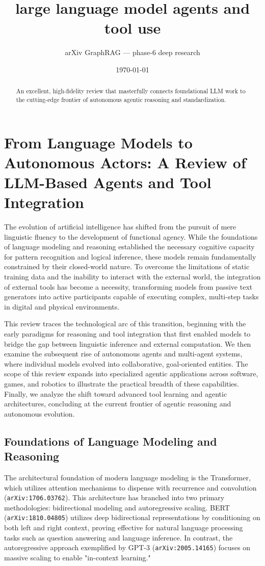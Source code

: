 \documentclass[11pt]{article}
\title{large language model agents and tool use}
\author{arXiv GraphRAG --- phase-6 deep research}
\date{\today}
\begin{document}
\maketitle

\begin{abstract}
An excellent, high-fidelity review that masterfully connects foundational LLM work to the cutting-edge frontier of autonomous agentic reasoning and standardization.
\end{abstract}

\section{From Language Models to Autonomous Actors: A Review of LLM-Based Agents and Tool Integration}

The evolution of artificial intelligence has shifted from the pursuit of mere linguistic fluency to the development of functional agency. While the foundations of language modeling and reasoning established the necessary cognitive capacity for pattern recognition and logical inference, these models remain fundamentally constrained by their closed-world nature. To overcome the limitations of static training data and the inability to interact with the external world, the integration of external tools has become a necessity, transforming models from passive text generators into active participants capable of executing complex, multi-step tasks in digital and physical environments.

This review traces the technological arc of this transition, beginning with the early paradigms for reasoning and tool integration that first enabled models to bridge the gap between linguistic inference and external computation. We then examine the subsequent rise of autonomous agents and multi-agent systems, where individual models evolved into collaborative, goal-oriented entities. The scope of this review expands into specialized agentic applications across software, games, and robotics to illustrate the practical breadth of these capabilities. Finally, we analyze the shift toward advanced tool learning and agentic architectures, concluding at the current frontier of agentic reasoning and autonomous evolution.

\subsection{Foundations of Language Modeling and Reasoning}

The architectural foundation of modern language modeling is the Transformer, which utilizes attention mechanisms to dispense with recurrence and convolution (\texttt{arXiv:1706.03762}). This architecture has branched into two primary methodologies: bidirectional modeling and autoregressive scaling. BERT (\texttt{arXiv:1810.04805}) utilizes deep bidirectional representations by conditioning on both left and right context, proving effective for natural language processing tasks such as question answering and language inference. In contrast, the autoregressive approach exemplified by GPT-3 (\texttt{arXiv:2005.14165}) focuses on massive scaling to enable "in-context learning."
\end{document}
